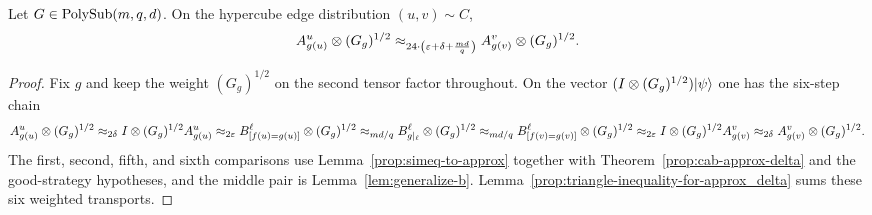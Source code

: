\begin{lemma}\label{lem:local-variance-of-points}
	\leanok
	Let $G \in \mathrm{PolySub}(m,q,d)$. On the hypercube edge distribution $(u,v) \sim C$,
	\begin{equation}
		A^u_{g(u)} \otimes (G_g)^{1/2}
		\approx_{24\cdot\left(\varepsilon+\delta+\frac{md}{q}\right)}
		A^v_{g(v)} \otimes (G_g)^{1/2}.
		\label{eq:local-variance-of-points-equation}
	\end{equation}
\end{lemma}
\begin{proof}
	\leanok
	Fix $g$ and keep the weight $(G_g)^{1/2}$ on the second tensor factor throughout. On the vector $(I\otimes (G_g)^{1/2})\lvert \psi \rangle$ one has the six-step chain
	\[
		A^u_{g(u)} \otimes (G_g)^{1/2}
		\approx_{2\delta} I\otimes (G_g)^{1/2} A^u_{g(u)}
		\approx_{2\varepsilon} B^\ell_{[f(u)=g(u)]} \otimes (G_g)^{1/2}
		\approx_{md/q} B^\ell_{g|_\ell} \otimes (G_g)^{1/2}
		\approx_{md/q} B^\ell_{[f(v)=g(v)]} \otimes (G_g)^{1/2}
		\approx_{2\varepsilon} I\otimes (G_g)^{1/2} A^v_{g(v)}
		\approx_{2\delta} A^v_{g(v)} \otimes (G_g)^{1/2}.
	\]
	The first, second, fifth, and sixth comparisons use Lemma~\ref{prop:simeq-to-approx} together with Theorem~\ref{prop:cab-approx-delta} and the good-strategy hypotheses, and the middle pair is Lemma~\ref{lem:generalize-b}. Lemma~\ref{prop:triangle-inequality-for-approx_delta} sums these six weighted transports.
\end{proof}


